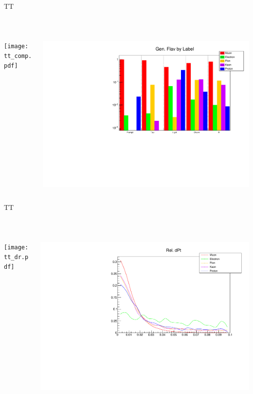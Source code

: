 \documentclass[10pt,handout]{beamer}
\begin{document}
\begin{frame}{ TT } 

\quad \quad \\
\begin{columns}
\begin{column}{0.5\textwidth}

\texttt{[image: tt\_comp.pdf]}

\end{column}
\begin{column}{0.5\textwidth}

\includegraphics[scale=.3]{tt_flav.pdf}
\end{column}
\end{columns}
\end{frame}


\begin{frame}{ TT } 

\quad \quad \\
\begin{columns}
\begin{column}{0.5\textwidth}

\texttt{[image: tt\_dr.pdf]}

\end{column}
\begin{column}{0.5\textwidth}

\includegraphics[scale=.3]{tt_dptrel.pdf}
\end{column}
\end{columns}
\end{frame}
\end{document}
